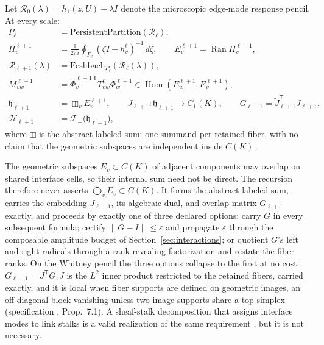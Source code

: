 \documentclass[11pt,letterpaper]{article}
\newcommand{\Fock}{\mathcal{F}_{-}}
\newcommand{\hh}{\mathfrak{h}}
\newcommand{\HK}{\mathcal{H}}
\newcommand{\RN}{\mathcal{R}}
\newcommand{\lsum}{\mathbin{\boxplus}}
\begin{document}
Let $\RN_0(\lambda)=h_1(z,U)-\lambda I$ denote the microscopic edge-mode
response pencil. At every scale:
\begin{equation*}
\boxed{
\begin{aligned}
  P_{\ell} &= \mathrm{PersistentPartition}(\RN_{\ell}),\\
  \Pi_v^{\ell+1}
    &=\frac{1}{2\pi i}\oint_{\Gamma_v}
      (\zeta I-h_v^\ell)^{-1}\,d\zeta,\qquad
  E_v^{\ell+1}=\operatorname{Ran}\Pi_v^{\ell+1},\\
  \RN_{\ell+1}(\lambda) &= \mathrm{Feshbach}_{P_{\ell}}(\RN_{\ell}(\lambda)),\\
  M_{vw}^{\ell+1}
    &=\widetilde\Phi_v^{\ell+1\,\mathsf T}
      T_{vw}^{\ell}\Phi_w^{\ell+1}
      \in\operatorname{Hom}(E_w^{\ell+1},E_v^{\ell+1}),\\
  \hh_{\ell+1} &= \lsum_{v}E_{v}^{\ell+1},\qquad
    J_{\ell+1}:\hh_{\ell+1}\to C_1(K),\qquad
    G_{\ell+1}
      =\widetilde J_{\ell+1}^{\mathsf T}J_{\ell+1},\\
  \HK_{\ell+1} &= \Fock\bigl(\hh_{\ell+1}\bigr),
\end{aligned}}
\end{equation*}
where $\lsum$ is the abstract labeled sum: one summand per retained fiber, with
no claim that the geometric subspaces are independent inside $C(K)$.

The geometric subspaces $E_{v}\subset C(K)$ of adjacent components may overlap
on shared interface cells, so their internal sum need not be direct. The
recursion therefore never asserts $\bigoplus_{v}E_{v}\subset C(K)$. It forms
the abstract labeled sum, carries the embedding $J_{\ell+1}$, its algebraic
dual, and overlap matrix $G_{\ell+1}$ exactly, and proceeds by exactly one of
three declared options: carry $G$ in every subsequent formula; certify
$\lVert G-I\rVert\le\varepsilon$ and propagate $\varepsilon$ through the
composable amplitude budget of Section~\ref{sec:interactions}; or quotient
$G$'s left and right radicals through a rank-revealing factorization and
restate the fiber ranks. On the Whitney pencil the three options collapse
to the first at no cost: $G_{\ell+1}=J^{\mathsf T}G_1J$ is the $L^{2}$ inner
product restricted to the retained fibers, carried exactly, and it is local
when fiber supports are defined on geometric images, an off-diagonal block
vanishing unless two image supports share a top simplex (specification
\cite{whitneyspec}, Prop.~7.1). A sheaf-stalk decomposition that assigns interface
modes to link stalks is a valid realization of the same requirement
\cite{hansenghrist2019}, but it is not necessary.
\end{document}
